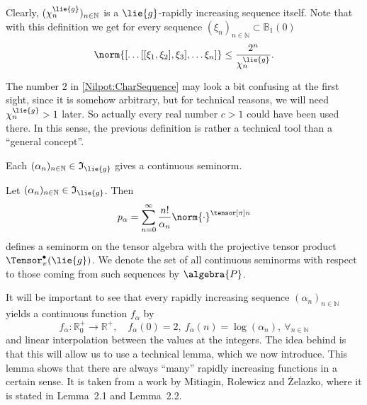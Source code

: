 Clearly, $(\chi_n^{\lie{g}})_{n \in \mathbb{N}}$ is a $\lie{g}$-rapidly 
increasing sequence itself. Note that with this definition we get for every 
sequence $(\xi_n)_{n \in \mathbb{N}} \subset \mathbb{B}_1(0)$
\begin{equation}
	\label{Nilpot:ChiEstimate}
	\norm{
		[ \ldots [[\xi_1, \xi_2], \xi_3], \ldots \xi_n]
	}
	\leq
	\frac{2^n}{\chi^{\lie{g}}_n}.
\end{equation}
\begin{remark}
	The number $2$ in \eqref{Nilpot:CharSequence} may look a bit confusing at 
	the first sight, since it is somehow arbitrary, but for technical reasons, 
	we will need $\chi^{\lie{g}}_n > 1$ later. 
	So actually every real number $c > 1$ 
	could have been used there. In this sense, the previous definition is rather 
	a technical tool than a ``general concept''.
\end{remark}
Each $(\alpha_n)_{n \in \mathbb{N}} \in \mathfrak{I}_{\lie{g}}$ gives a continuous 
seminorm.
\begin{definition}
	\label{Def:AdaptedBanachSeminorms}
	Let $(\alpha_n)_{n \in \mathbb{N}} \in \mathfrak{I}_{\lie{g}}$. Then
	\begin{equation*}
		p_{\alpha}
		=
		\sum\limits_{n = 0}^{\infty}
		\frac{n!}{\alpha_n}
		\norm{\cdot}^{\tensor[\pi] n}
	\end{equation*}
	defines a seminorm on the tensor algebra with the projective tensor product 
	$\Tensor_{\pi}^{\bullet}(\lie{g})$. We denote the set of all continuous 
	seminorms with respect to those	coming from such sequences by $\algebra{P}$.
\end{definition}
It will be important to see that every rapidly increasing sequence 
$(\alpha_n)_{n \in \mathbb{N}}$ yields a continuous function $f_{\alpha}$ by
\begin{equation}
	\label{Nilpot:IncreasingFunction}
	f_{\alpha}
	\colon
	\mathbb{R}_0^+
	\longrightarrow
	\mathbb{R}^+
	, \quad
	f_{\alpha}(0)
	=
	2
	,\
	f_{\alpha}(n)
	=
	\log \left( \alpha_n \right)
	,\
	\forall_{n \in \mathbb{N}}
\end{equation}
and linear interpolation between the values at the integers. The idea behind is 
that this will allow us to use a technical lemma, which we now introduce. This 
lemma shows that there are always ``many'' rapidly increasing functions in a 
certain sense. It is taken from a work \cite{mitiagin.rolewicz.zelazko:1962a} by 
Mitiagin, Rolewicz and \.{Z}elazko, where it is stated in Lemma~2.1 and Lemma~2.2.
